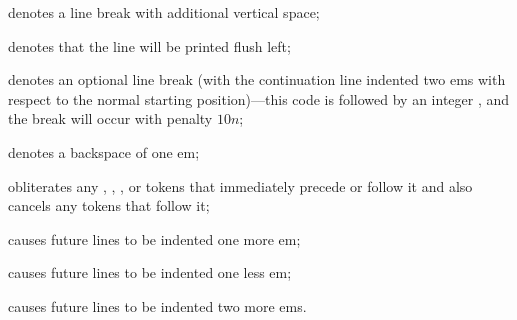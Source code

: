 \yskip\hang {} denotes a line break with additional vertical
space;

\yskip\hang {} denotes that the line will be printed flush
left;

\yskip\hang {} denotes an optional line break (with the continuation
line indented two ems with respect to the normal starting position)---this
code is followed by an integer , and the break will occur with penalty
$10n$;

\yskip\hang {} denotes a backspace of one em;

\yskip\hang {} obliterates any , , , or
 tokens that immediately precede or follow it and also
cancels any
 tokens that follow it;

\yskip\hang {} causes future lines to be indented one more em;

\yskip\hang {} causes future lines to be indented one less em;

\yskip\hang {} causes future lines to be indented two more ems.

